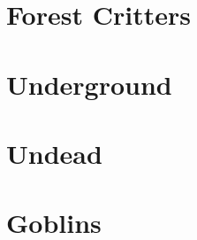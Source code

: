 \documentclass[a4paper,openany]{book}
\begin{document}
\section{Forest Critters}

\begin{multicols}{2}

\bear

\boar

\huntingdog

\cat

\chitincrawler

\basilisk

\end{multicols}

\section{Underground}

\begin{multicols}{2}

\umberhulk

\watcher

\jelly

\jelly

\jelly

\jelly

\end{multicols}

\section{Undead}

\begin{multicols}{2}

\ghoul

\ghast

\demilich

\lich

\end{multicols}

\section{Goblins}
\end{document}
